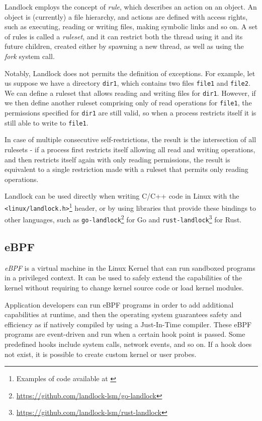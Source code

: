 Landlock employs the concept of \textit{rule}, which describes an action
on an object. An object is (currently) a file hierarchy, and actions are
defined with access rights, such as executing, reading or writing files, making
symbolic links and so on.
A set of rules is called a \textit{ruleset}, and it can restrict both the thread
using it and its future children, created either by spawning a new thread, as well
as using the \textit{fork} system call.

Notably, Landlock does not permits the definition of exceptions.
For example, let us suppose we have a directory \texttt{dir1}, which contains two files
\texttt{file1} and \texttt{file2}. We can define a ruleset that allows
reading and writing files for \texttt{dir1}.
However, if we then define another ruleset comprising only of read operations
for \texttt{file1}, the permissions specified for \texttt{dir1} are still
valid, so when a process restricts itself it is still able to write to \texttt{file1}.

In case of multiple consecutive self-restrictions, the result is the intersection
of all rulesets - if a process first restricts itself allowing all read and writing operations,
and then restricts itself again with only reading permissions, the result is equivalent
to a single restriction made with a ruleset that permits only reading operations.

Landlock can be used directly when writing C/C++ code in Linux with the
\texttt{<linux/landlock.h>}\footnote{Examples of code available at \cite{landlock-user-space}}
header, or by using libraries that provide these bindings to other languages,
such as \texttt{go-landlock}\footnote{\url{https://github.com/landlock-lsm/go-landlock}}
for Go and \texttt{rust-landlock}\footnote{\url{https://github.com/landlock-lsm/rust-landlock}} for Rust.

\subsection{eBPF}
\textit{eBPF} \cite{ebpf} is a virtual machine in the Linux Kernel that can run sandboxed programs
in a privileged context. It can be used to safely extend the capabilities of the kernel
without requiring to change kernel source code or load kernel modules.

Application developers can run eBPF programs in order to add additional capabilities at runtime,
and then the operating system guarantees safety and efficiency as if natively compiled
by using a Just-In-Time compiler.
These eBPF programs are event-driven and run when a certain hook point is passed. Some
predefined hooks include system calls, network events, and so on. If a hook does not exist,
it is possible to create custom kernel or user probes.

